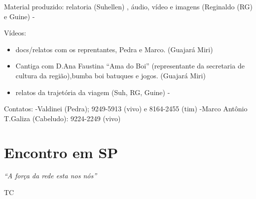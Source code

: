 \documentclass[a4paper, 11pt, oneside]{Relatorio_sem}  %
\begin{document}
Material produzido: 
relatoria (Suhellen) ,
áudio, vídeo e imagens (Reginaldo (RG) e Guine) - 

Vídeos: 
\begin{itemize}
 \item docs/relatos com os reprentantes, Pedra e Marco. (Guajará Miri)
 \item Cantiga com D.Ana Faustina ``Ama do Boi'' (representante da
   secretaria de cultura da região),bumba boi batuques e
   jogos. (Guajará Miri)
 \item relatos da trajetória da viagem (Suh, RG, Guine) -
\end{itemize}


Contatos: -Valdinei (Pedra); 9249-5913 (vivo) e 8164-2455 (tim) -Marco
Antônio T.Galiza (Cabeludo): 9224-2249 (vivo)




\chapter{Encontro em SP}





\clearpage  %

\pagestyle{empty}  %

\null\vfill
\textit{``A força da rede esta nos nós''}

\begin{flushright}
TC
\end{flushright}

\vfill\vfill\vfill\vfill\vfill\vfill\null
\clearpage  %

\pagestyle{fancy}  %




\end{document}
